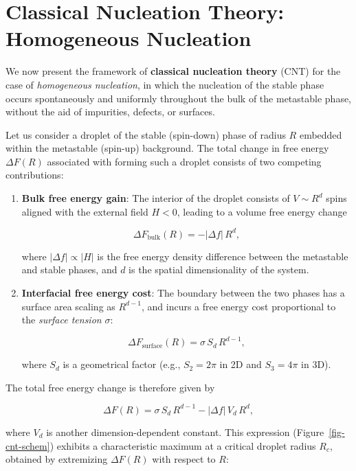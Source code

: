\documentclass[
  letterpaper,
  enabledeprecatedfontcommands]{report}
\begin{document}
\section{Classical Nucleation Theory: Homogeneous
Nucleation}\label{sec-cnt}

We now present the framework of \textbf{classical nucleation theory}
(CNT) for the case of \emph{homogeneous nucleation}, in which the
nucleation of the stable phase occurs spontaneously and uniformly
throughout the bulk of the metastable phase, without the aid of
impurities, defects, or surfaces.

Let us consider a droplet of the stable (spin-down) phase of radius
\(R\) embedded within the metastable (spin-up) background. The total
change in free energy \(\Delta F(R)\) associated with forming such a
droplet consists of two competing contributions:

\begin{enumerate}
\def\labelenumi{\arabic{enumi}.}
\item
  \textbf{Bulk free energy gain}: The interior of the droplet consists
  of \(V \sim R^d\) spins aligned with the external field \(H < 0\),
  leading to a volume free energy change

  \[
  \Delta F_{\text{bulk}}(R) = -|\Delta f| \, R^d,
  \]

  where \(|\Delta f| \propto |H|\) is the free energy density difference
  between the metastable and stable phases, and \(d\) is the spatial
  dimensionality of the system.
\item
  \textbf{Interfacial free energy cost}: The boundary between the two
  phases has a surface area scaling as \(R^{d-1}\), and incurs a free
  energy cost proportional to the \emph{surface tension} \(\sigma\):

  \[
  \Delta F_{\text{surface}}(R) = \sigma \, S_d \, R^{d-1},
  \]

  where \(S_d\) is a geometrical factor (e.g., \(S_2 = 2\pi\) in 2D and
  \(S_3 = 4\pi\) in 3D).
\end{enumerate}

The total free energy change is therefore given by

\[
\Delta F(R) = \sigma \, S_d \, R^{d-1} - |\Delta f| \, V_d \, R^d,
\]

where \(V_d\) is another dimension-dependent constant. This expression
(Figure~\ref{fig-cnt-schem}) exhibits a characteristic maximum at a
critical droplet radius \(R_c\), obtained by extremizing \(\Delta F(R)\)
with respect to \(R\):
\end{document}
